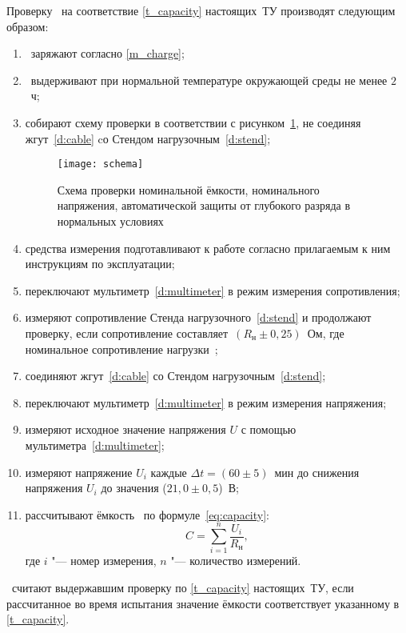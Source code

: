 Проверку \dut \ на соответствие \ref{t_capacity} настоящих~ТУ производят следующим образом:
%
\begin{enumerate}
	\item\label{itm:cap1} \dut \ заряжают согласно \ref{m_charge};
	\item\label{itm:cap2} \dut \ выдерживают при нормальной температуре окружающей среды не менее $2$~ч;
	\item\label{itm:cap3} собирают схему проверки в соответствии с рисунком~\ref{fig:capacity}, не соединяя жгут~\ref{d:cable} cо Стендом нагрузочным~\ref{d:stend};
%
		\begin{figure}[!htb]
			\centering
			\texttt{[image: schema]}
			\begin{picdescription}[label={E\arabic* ---}, ref={E\arabic*}, before={\vspace{0pt}\small}]
				\item\label{d:cable} \hyperref[e:cable]{Жгут \cableRN}.
			\end{picdescription}
			\caption{Схема проверки номинальной ёмкости, номинального напряжения, автоматической защиты от глубокого разряда в нормальных условиях}
			\label{fig:capacity}
		\end{figure}
%
	\item\label{itm:cap4} средства измерения подготавливают к работе согласно прилагаемым к ним инструкциям по эксплуатации; 
	\item\label{itm:cap5} переключают мультиметр~\ref{d:multimeter} в режим измерения сопротивления;
	\item\label{itm:cap6} измеряют сопротивление Стенда нагрузочного~\ref{d:stend} и продолжают проверку, если сопротивление составляет~$(R_{\text{н}} \pm 0,25)$~Ом, где номинальное сопротивление нагрузки~\load ;
	\item\label{itm:cap7} соединяют жгут~\ref{d:cable} со Стендом нагрузочным~\ref{d:stend};
	\item\label{itm:cap8} переключают мультиметр~\ref{d:multimeter} в режим измерения напряжения;
	\item\label{itm:cap9} измеряют исходное значение напряжения $U$ с помощью мультиметра~\ref{d:multimeter};
	\item измеряют напряжение $U_i$ каждые $\Delta t = (60 \pm 5)$~мин до снижения напряжения $U_i$ до значения ($21,0 \pm 0,5$)~В;
	\item рассчитывают ёмкость \dut \ по формуле~\eqref{eq:capacity}:
		\begin{equation}\label{eq:capacity}
			C = \sum_{i=1}^{n} \frac{U_i}{R_\text{н}},
		\end{equation}
		где $i$ "--- номер измерения, $n$ "--- количество измерений.
\end{enumerate}
 
\dut \ считают выдержавшим проверку по \ref{t_capacity} настоящих~ТУ, если рассчитанное во время испытания значение ёмкости соответствует указанному в \ref{t_capacity}.
